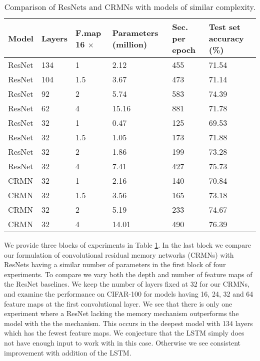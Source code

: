 \documentclass{article}
\begin{document}
\begin{table}[htb!]
\centering
\begin{tabular}{ p{1.5cm}  p{.9cm} p{.7cm}  p{1.7cm}  p{1.5cm}  p{1.9cm}  }
 \hline
Model & Layers & F.map 16 $\times$ & Parameters \newline (million) &  Sec. per \newline epoch  & Test set \newline accuracy (\%)   \\ \hline
ResNet	&  134 &	1	& 2.12  &	455  &	71.54 \\
ResNet	&  104 &	1.5	& 3.67  &	473  &	71.14 \\
ResNet	&  92  &	2	& 5.74  &	583  &	74.39 \\
ResNet	&  62  &	4	& 15.16 &	881  &	71.78 \\ \hline
ResNet  &  32  &  1	    & 0.47 &	125  & 69.53 \\
ResNet  &  32  &  1.5   & 1.05 &	173  & 71.88 \\
ResNet  &  32  &  2	    & 1.86 &	199  & 73.28 \\
ResNet  &  32  &  4	    & 7.41 &	427  & 75.73 \\ \hline
CRMN    &  32  &	1	& 2.16  &	140 &   70.84 \\
CRMN    &  32  &	1.5	& 3.56  &	165 &	73.18 \\
CRMN    &  32  &	2	& 5.19  &	233 &   74.67 \\
CRMN    &  32  &	4	& 14.01 &	490 &	76.39 \\ \hline %
\end{tabular}
\caption{Comparison of ResNets and CRMNs with models of similar complexity.}
\label{explore}
\end{table}

We provide three blocks of experiments in Table \ref{explore}. In the last block
we compare our formulation of convolutional residual memory networks (CRMNs) with ResNets having a similar number of parameters in the first block of four experiments. To compare we vary both the depth and number of feature maps of the ResNet baselines. We keep the number of layers fixed at 32 for our CRMNs, and examine the performance on CIFAR-100 for models having 16, 24, 32 and 64 feature maps at the first convolutional layer.  We see that there is only one experiment where a ResNet lacking the memory mechanism outperforms the model with the the mechanism. This occurs in the deepest model with 134 layers which has the fewest feature maps. We conjecture that the LSTM simply does not have enough input to work with in this case. Otherwise we see consistent improvement with addition of the LSTM.
\end{document}
